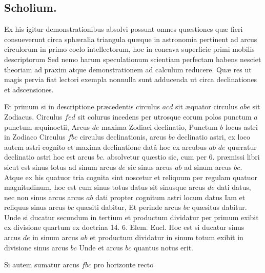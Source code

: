\documentclass[11pt,a4paper]{article}
\begin{document}
\subsection*{Scholium.}

Ex his igitur demonstrationibus absolvi possunt omnes quæstiones
quæ fieri consueverunt circa sphæralia triangula quæque in
astronomia pertinent ad arcus circulorum in primo coelo intellectorum,
hoc in concava superficie primi mobilis descriptorum
Sed nemo harum speculationum scientiam perfectam habens nesciet
theoriam ad praxim atque demonstrationem ad calculum reducere.
Quæ res ut magis pervia fiat lectori exempla nonnulla sunt adducenda
ut circa declinationes et adscensiones.

Et primum si in descriptione præcedentis circulus $acd$ sit æquator
circulus $abe$ sit Zodiacus. Circulus $fed$ sit colurus incedens per
utrosque eorum polos punctum $a$ punctum æquinoctii, Arcus $de$
maxima Zodiaci declinatio, Punctum $b$ locus astri in Zodiaco
Circulus $fbc$ circulus declinationis, arcus $bc$ declinatio astri,
ex loco autem astri cognito et maxima declinatione datâ hoc
ex arcubus $ab$ $de$ quæratur declinatio astri hoc est arcus $bc$.
absolvetur quæstio sic, cum per 6.  præmissi libri sicut est
sinus totus ad sinum arcus $de$ sic  sinus arcus $ab$ ad sinum
arcus $bc$. Atque ex his quatuor tria cognita sint noscetur et
reliquum per regulam quatuor magnitudinum, hoc est
cum sinus totus datus sit sinusque arcus $de$ dati datus, nec
non sinus arcus arcus $ab$ dati propter cognitum astri locum
datus Iam et reliquus sinus arcus $bc$ quæsiti dabitur, Et perinde
arcus $bc$ quæsitus dabitur. Unde si ducatur secundum in
tertium et productum dividatur per primum exibit ex divisione
quartum ex doctrina 14. 6. Elem. Eucl. Hoc est si ducatur sinus
arcus $de$ in sinum arcus $ab$ et productum dividatur in sinum
totum exibit in divisione sinus arcus $bc$ Unde et arcus $bc$ quantus
notus erit.

Si autem sumatur arcus $fbc$ pro horizonte recto
\end{document}
